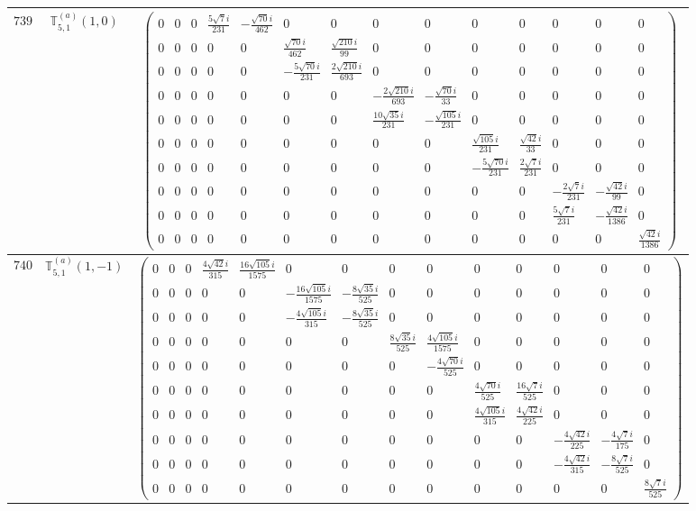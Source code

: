 \documentclass[fleqn,8pt,landscape]{jsarticle}
\begin{document}
\begin{center}
\begin{longtable}{ccc}
$ 739 $ & $ \mathbb{T}_{5,1}^{(a)}(1,0) $ & $ \begin{pmatrix} 0 & 0 & 0 & \frac{5 \sqrt{7} i}{231} & - \frac{\sqrt{70} i}{462} & 0 & 0 & 0 & 0 & 0 & 0 & 0 & 0 & 0 \\ 0 & 0 & 0 & 0 & 0 & \frac{\sqrt{70} i}{462} & \frac{\sqrt{210} i}{99} & 0 & 0 & 0 & 0 & 0 & 0 & 0 \\ 0 & 0 & 0 & 0 & 0 & - \frac{5 \sqrt{70} i}{231} & \frac{2 \sqrt{210} i}{693} & 0 & 0 & 0 & 0 & 0 & 0 & 0 \\ 0 & 0 & 0 & 0 & 0 & 0 & 0 & - \frac{2 \sqrt{210} i}{693} & - \frac{\sqrt{70} i}{33} & 0 & 0 & 0 & 0 & 0 \\ 0 & 0 & 0 & 0 & 0 & 0 & 0 & \frac{10 \sqrt{35} i}{231} & - \frac{\sqrt{105} i}{231} & 0 & 0 & 0 & 0 & 0 \\ 0 & 0 & 0 & 0 & 0 & 0 & 0 & 0 & 0 & \frac{\sqrt{105} i}{231} & \frac{\sqrt{42} i}{33} & 0 & 0 & 0 \\ 0 & 0 & 0 & 0 & 0 & 0 & 0 & 0 & 0 & - \frac{5 \sqrt{70} i}{231} & \frac{2 \sqrt{7} i}{231} & 0 & 0 & 0 \\ 0 & 0 & 0 & 0 & 0 & 0 & 0 & 0 & 0 & 0 & 0 & - \frac{2 \sqrt{7} i}{231} & - \frac{\sqrt{42} i}{99} & 0 \\ 0 & 0 & 0 & 0 & 0 & 0 & 0 & 0 & 0 & 0 & 0 & \frac{5 \sqrt{7} i}{231} & - \frac{\sqrt{42} i}{1386} & 0 \\ 0 & 0 & 0 & 0 & 0 & 0 & 0 & 0 & 0 & 0 & 0 & 0 & 0 & \frac{\sqrt{42} i}{1386} \end{pmatrix} $ \\ \hline
$ 740 $ & $ \mathbb{T}_{5,1}^{(a)}(1,-1) $ & $ \begin{pmatrix} 0 & 0 & 0 & \frac{4 \sqrt{42} i}{315} & \frac{16 \sqrt{105} i}{1575} & 0 & 0 & 0 & 0 & 0 & 0 & 0 & 0 & 0 \\ 0 & 0 & 0 & 0 & 0 & - \frac{16 \sqrt{105} i}{1575} & - \frac{8 \sqrt{35} i}{525} & 0 & 0 & 0 & 0 & 0 & 0 & 0 \\ 0 & 0 & 0 & 0 & 0 & - \frac{4 \sqrt{105} i}{315} & - \frac{8 \sqrt{35} i}{525} & 0 & 0 & 0 & 0 & 0 & 0 & 0 \\ 0 & 0 & 0 & 0 & 0 & 0 & 0 & \frac{8 \sqrt{35} i}{525} & \frac{4 \sqrt{105} i}{1575} & 0 & 0 & 0 & 0 & 0 \\ 0 & 0 & 0 & 0 & 0 & 0 & 0 & 0 & - \frac{4 \sqrt{70} i}{525} & 0 & 0 & 0 & 0 & 0 \\ 0 & 0 & 0 & 0 & 0 & 0 & 0 & 0 & 0 & \frac{4 \sqrt{70} i}{525} & \frac{16 \sqrt{7} i}{525} & 0 & 0 & 0 \\ 0 & 0 & 0 & 0 & 0 & 0 & 0 & 0 & 0 & \frac{4 \sqrt{105} i}{315} & \frac{4 \sqrt{42} i}{225} & 0 & 0 & 0 \\ 0 & 0 & 0 & 0 & 0 & 0 & 0 & 0 & 0 & 0 & 0 & - \frac{4 \sqrt{42} i}{225} & - \frac{4 \sqrt{7} i}{175} & 0 \\ 0 & 0 & 0 & 0 & 0 & 0 & 0 & 0 & 0 & 0 & 0 & - \frac{4 \sqrt{42} i}{315} & - \frac{8 \sqrt{7} i}{525} & 0 \\ 0 & 0 & 0 & 0 & 0 & 0 & 0 & 0 & 0 & 0 & 0 & 0 & 0 & \frac{8 \sqrt{7} i}{525} \end{pmatrix} $ \\ \hline

\end{longtable}
\end{center}
\end{document}
